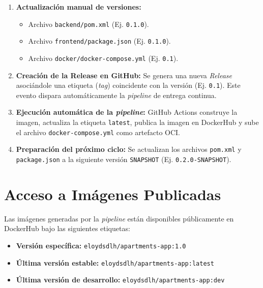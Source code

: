 \begin{enumerate}
    \item \textbf{Actualización manual de versiones:}
    \begin{itemize}
        \item Archivo \texttt{backend/pom.xml} (Ej. \texttt{0.1.0}).
        \item Archivo \texttt{frontend/package.json} (Ej. \texttt{0.1.0}).
        \item Archivo \texttt{docker/docker-compose.yml} (Ej. \texttt{0.1}).
    \end{itemize}
    \item \textbf{Creación de la Release en GitHub:} Se genera una nueva \textit{Release} 
    asociándole una etiqueta (\textit{tag}) coincidente con la versión (Ej. \texttt{0.1}). 
    Este evento dispara automáticamente la \textit{pipeline} de entrega continua.
    \item \textbf{Ejecución automática de la \textit{pipeline}:} GitHub Actions construye 
    la imagen, actualiza la etiqueta \texttt{latest}, publica la imagen en DockerHub y sube 
    el archivo \texttt{docker-compose.yml} como artefacto OCI.
    \item \textbf{Preparación del próximo ciclo:} Se actualizan los archivos \texttt{pom.xml} 
    y \texttt{package.json} a la siguiente versión \texttt{SNAPSHOT} 
    (Ej. \texttt{0.2.0-SNAPSHOT}).
\end{enumerate}

\section{Acceso a Imágenes Publicadas}
Las imágenes generadas por la \textit{pipeline} están disponibles públicamente en DockerHub bajo las siguientes etiquetas:
\begin{itemize}
    \item \textbf{Versión específica:} \texttt{eloydsdlh/apartments-app:1.0}
    \item \textbf{Última versión estable:} \texttt{eloydsdlh/apartments-app:latest}
    \item \textbf{Última versión de desarrollo:} \texttt{eloydsdlh/apartments-app:dev}
\end{itemize}